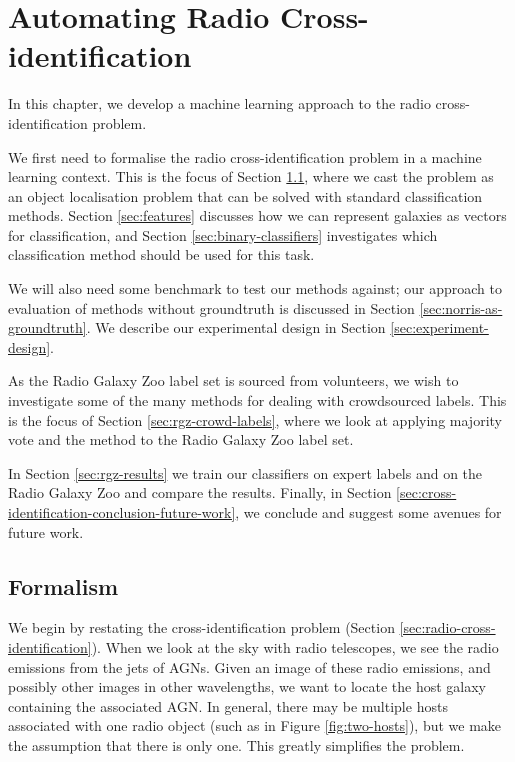 \chapter{Automating Radio Cross-identification}
\label{cha:cross-identification}

  In this chapter, we develop a machine learning approach to the radio
  cross-identification problem.

  We first need to formalise the radio cross-identification problem in a machine
  learning context. This is the focus of Section
  \ref{sec:cross-identification-formalism}, where we cast the problem as an
  object localisation problem that can be solved with standard classification
  methods. Section \ref{sec:features} discusses how we can represent galaxies as
  vectors for classification, and Section \ref{sec:binary-classifiers}
  investigates which classification method should be used for this task.

  We will also need some benchmark to test our methods against; our
  approach to evaluation of methods without groundtruth is discussed in Section
  \ref{sec:norris-as-groundtruth}. We describe our experimental design in
  Section \ref{sec:experiment-design}.

  As the Radio Galaxy Zoo label set is sourced from volunteers, we wish to
  investigate some of the many methods for dealing with crowdsourced labels.
  This is the focus of Section \ref{sec:rgz-crowd-labels}, where we look at
  applying majority vote and the \citeauthor{raykar10} method to the Radio
  Galaxy Zoo label set.

  In Section \ref{sec:rgz-results} we train our classifiers on expert labels and
  on the Radio Galaxy Zoo and compare the results. Finally, in Section
  \ref{sec:cross-identification-conclusion-future-work}, we conclude and suggest
  some avenues for future work.

\section{Formalism}
\label{sec:cross-identification-formalism}

  We begin by restating the cross-identification problem (Section
  \ref{sec:radio-cross-identification}). When we look at the sky with radio
  telescopes, we see the radio emissions from the jets of AGNs. Given an image
  of these radio emissions, and possibly other images in other wavelengths, we
  want to locate the host galaxy containing the associated AGN. In general,
  there may be multiple hosts associated with one radio object (such as in
  Figure \ref{fig:two-hosts}), but we make the assumption that there is only
  one. This greatly simplifies the problem.

